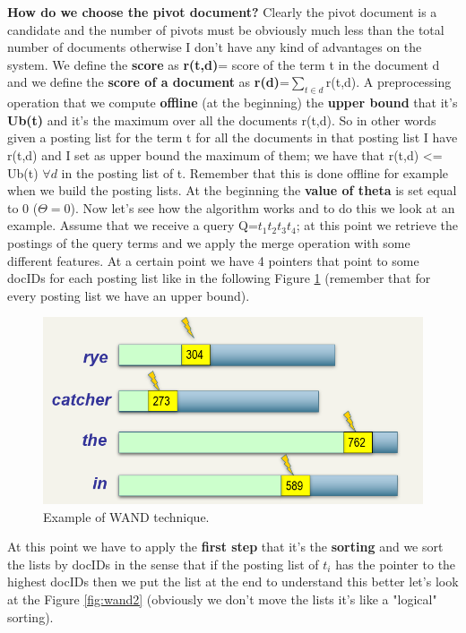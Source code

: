 \textbf{How do we choose the pivot document?} Clearly the pivot document is a candidate and the number of pivots must be obviously much less than the total number of documents otherwise I don't have any kind of advantages on the system.\newline
We define the \textbf{score} as \textbf{r(t,d)}= score of the term t in the document d and we define the \textbf{score of a document} as \textbf{r(d)}=$\sum_{t \in d}$r(t,d).\newline
A preprocessing operation that we compute \textbf{offline} (at the beginning) the \textbf{upper bound} that it's \textbf{Ub(t)} and it's the maximum over all the documents r(t,d). So in other words given a posting list for the term t for all the documents in that posting list I have r(t,d) and I set as upper bound the maximum of them; we have that r(t,d) <= Ub(t) $\forall d$ in the posting list of t. Remember that this is done offline for example when we build the posting lists.\newline
At the beginning the \textbf{value of theta} is set equal to 0 ($\Theta = 0$).\newline
Now let's see how the algorithm works and to do this we look at an example. Assume that we receive a query Q=$t_1t_2t_3t_4$; at this point we retrieve the postings of the query terms and we apply the merge operation with some different features. At a certain point we have 4 pointers that point to some docIDs for each posting list like in the following Figure \ref{fig:wand1} (remember that for every posting list we have an upper bound).\newline
\begin{figure}
    \centering
    \includegraphics[width=0.75\linewidth]{images/wand1.PNG}
    \caption{Example of WAND technique.}
    \label{fig:wand1}
\end{figure}
At this point we have to apply the \textbf{first step} that it's the \textbf{sorting} and we sort the lists by docIDs in the sense that if the posting list of $t_i$ has the pointer to the highest docIDs then we put the list at the end to understand this better let's look at the Figure \ref{fig:wand2} (obviously we don't move the lists it's like a "logical" sorting).\newline

